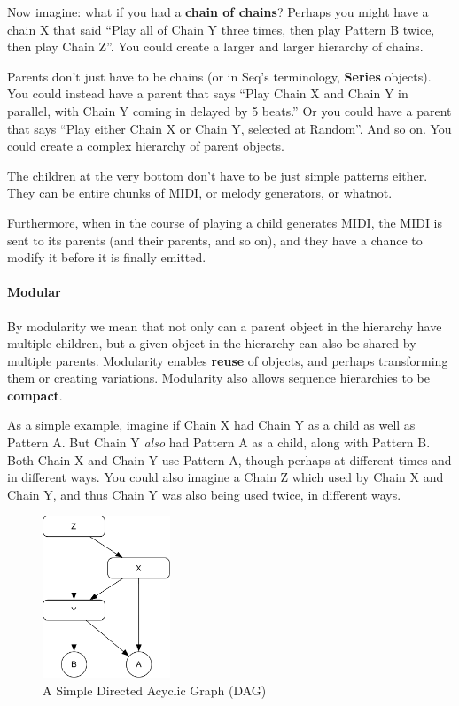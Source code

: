 \documentclass[twoside,10pt]{article}
\begin{document}
Now imagine: what if you had a {\bf chain of chains}?  Perhaps you might have a chain X that said ``Play all of Chain Y three times, then play Pattern B twice, then play Chain Z''.  You could create a larger and larger hierarchy of chains.

Parents don't just have to be chains (or in Seq's terminology, {\bf Series} objects).  You could instead have a parent that says ``Play Chain X and Chain Y in parallel, with Chain Y coming in delayed by 5 beats.''  Or you could have a parent that says ``Play either Chain X or Chain Y, selected at Random''.  And so on.  You could create a complex hierarchy of parent objects.

The children at the very bottom don't have to be just simple patterns either.  They can be entire chunks of MIDI, or melody generators, or whatnot.  

Furthermore, when in the course of playing a child generates MIDI, the MIDI is sent to its parents (and their parents, and so on), and they have a chance to modify it before it is finally emitted.

\paragraph{Modular} By modularity we mean that not only can a parent object in the hierarchy have multiple children, but a given object in the hierarchy can also be shared by multiple parents.  Modularity enables {\bf reuse} of objects, and perhaps transforming them or creating variations.   Modularity also allows sequence hierarchies to be {\bf compact}.

As a simple example, imagine if Chain X had Chain Y as a child as well as Pattern A.  But Chain Y {\it also} had Pattern A as a child, along with Pattern B.  Both Chain X and Chain Y use Pattern A, though perhaps at different times and in different ways.  You could also imagine a Chain Z which used by Chain X and Chain Y, and thus Chain Y was also being used twice, in different ways.

\begin{figure}
\vspace{-1em}
\includegraphics[width=1.5in]{dag}
\caption{A Simple Directed Acyclic Graph (DAG)}
\label{dag}
\end{figure}
\end{document}
